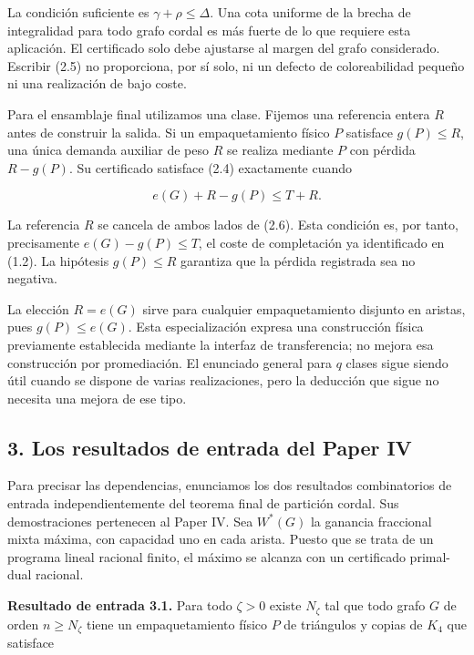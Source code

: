 \documentclass[spanish,11pt,a4paper]{article}
\begin{document}
La condición suficiente es \(\gamma+\rho\le\Delta\). Una cota uniforme
de la brecha de integralidad para todo grafo cordal es más fuerte de lo
que requiere esta aplicación. El certificado solo debe ajustarse al
margen del grafo considerado. Escribir (2.5) no proporciona, por sí
solo, ni un defecto de coloreabilidad pequeño ni una realización de bajo
coste.

Para el ensamblaje final utilizamos una clase. Fijemos una referencia
entera \(R\) antes de construir la salida. Si un empaquetamiento físico
\(P\) satisface \(g(P)\le R\), una única demanda auxiliar de peso \(R\)
se realiza mediante \(P\) con pérdida \(R-g(P)\). Su certificado
satisface (2.4) exactamente cuando

\[
e(G)+R-g(P)\le T+R.
\tag{2.6}
\]

La referencia \(R\) se cancela de ambos lados de (2.6). Esta condición
es, por tanto, precisamente \(e(G)-g(P)\le T\), el coste de completación
ya identificado en (1.2). La hipótesis \(g(P)\le R\) garantiza que la
pérdida registrada sea no negativa.

La elección \(R=e(G)\) sirve para cualquier empaquetamiento disjunto en
aristas, pues \(g(P)\le e(G)\). Esta especialización expresa una
construcción física previamente establecida mediante la interfaz de
transferencia; no mejora esa construcción por promediación. El enunciado
general para \(q\) clases sigue siendo útil cuando se dispone de varias
realizaciones, pero la deducción que sigue no necesita una mejora de ese
tipo.

\subsection{3. Los resultados de entrada del Paper
IV}\label{los-resultados-de-entrada-del-paper-iv}

Para precisar las dependencias, enunciamos los dos resultados
combinatorios de entrada independientemente del teorema final de
partición cordal. Sus demostraciones pertenecen al Paper IV. Sea
\(W^*(G)\) la ganancia fraccional mixta máxima, con capacidad uno en
cada arista. Puesto que se trata de un programa lineal racional finito,
el máximo se alcanza con un certificado primal-dual racional.

\textbf{Resultado de entrada 3.1.} Para todo \(\zeta>0\) existe
\(N_\zeta\) tal que todo grafo \(G\) de orden \(n\ge N_\zeta\) tiene un
empaquetamiento físico \(P\) de triángulos y copias de \(K_4\) que
satisface
\end{document}
